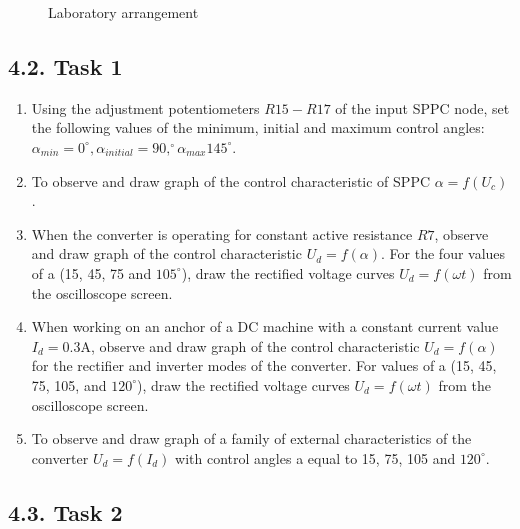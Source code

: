 \documentclass[a4paper,14pt]{article}
\begin{document}
\begin{landscape}
        \hspace{-3cm}
        \vspace{1cm}
\begin{figure}[ht!]

\caption{Laboratory arrangement}
\label{labsetup2}
\end{figure}
\end{landscape}


\subsection{4.2. Task 1}\label{taskI}

\begin{enumerate}
\item Using the adjustment potentiometers $R15-R17$ of the input SPPC node, set the following values of the minimum, initial and maximum control angles: $\alpha_{min} = 0^\circ, \alpha_{initial} = 90,^\circ \alpha_{max} 145^\circ$.


\item\label{taskI_second} To observe and draw graph of the control characteristic of SPPC
$\alpha = f(U_c)$.

\item\label{taskI_third} When the converter is operating for constant active resistance $R7$, observe and draw graph of the control characteristic $U_d = f (\alpha)$. For the four values of a (15, 45, 75 and $105^\circ$), draw the rectified voltage curves 
	$U_d = f (\omega t)$ from the oscilloscope screen.

\item When working on an anchor of a DC machine with a constant current value $I_d = 0.3$A, 
observe and draw graph of  the control characteristic $U_d = f (\alpha)$ for the rectifier and inverter modes of the converter.
For values of a (15, 45, 75, 105, and $120^\circ$), 
draw the rectified voltage curves $U_d = f(\omega t)$ from the oscilloscope screen.

\item To observe and draw graph of a family of external characteristics of the converter $U_d = f(I_d)$ with control angles a equal to 15, 75, 105 and $120^\circ$.

\end{enumerate}

\subsection{4.3. Task 2}
\end{document}
